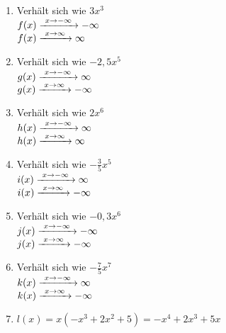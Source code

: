 \newpage
\begin{Answer}[ref=ganzVerA1]\\
	\begin{minipage}{\textwidth}
		\begin{minipage}[t]{0.49\textwidth}
			\begin{enumerate}[label=\alph*)]
				\item Verhält sich wie \(3x^3\)\\
				\(f(x)\xrightarrow{\hphantom{\ }x\to-\infty\hphantom{\ }}-\infty\)\\
				\(f(x)\xrightarrow{\hphantom{\ }x\to\infty\hphantom{\ }}\infty\)
				\item Verhält sich wie \(-2,5x^5\)\\
				\(g(x)\xrightarrow{\hphantom{\ }x\to-\infty\hphantom{\ }}\infty\)\\
				\(g(x)\xrightarrow{\hphantom{\ }x\to\infty\hphantom{\ }}-\infty\)
				\item Verhält sich wie \(2x^6\)\\
				\(h(x)\xrightarrow{\hphantom{\ }x\to-\infty\hphantom{\ }}\infty\)\\
				\(h(x)\xrightarrow{\hphantom{\ }x\to\infty\hphantom{\ }}\infty\)
				\item Verhält sich wie \(-\frac{3}{5}x^5\)\\
				\(i(x)\xrightarrow{\hphantom{\ }x\to-\infty\hphantom{\ }}\infty\)\\
				\(i(x)\xrightarrow{\hphantom{\ }x\to\infty\hphantom{\ }}-\infty\)
			\end{enumerate}
		\end{minipage}
		\begin{minipage}[t]{0.49\textwidth}
			\begin{enumerate}[label=\alph*)]
				\setcounter{enumi}{4}
				\item Verhält sich wie \(-0,3x^6\)\\
				\(j(x)\xrightarrow{\hphantom{\ }x\to-\infty\hphantom{\ }}-\infty\)\\
				\(j(x)\xrightarrow{\hphantom{\ }x\to\infty\hphantom{\ }}-\infty\)
				\item Verhält sich wie \(-\frac{7}{5}x^7\)\\
				\(k(x)\xrightarrow{\hphantom{\ }x\to-\infty\hphantom{\ }}\infty\)\\
				\(k(x)\xrightarrow{\hphantom{\ }x\to\infty\hphantom{\ }}-\infty\)
				\item \(l(x)=x\left(-x^3+2x^2+5\right)=-x^4+2x^3+5x\)\\

\end{enumerate}
\end{minipage}
\end{minipage}
\end{Answer}
